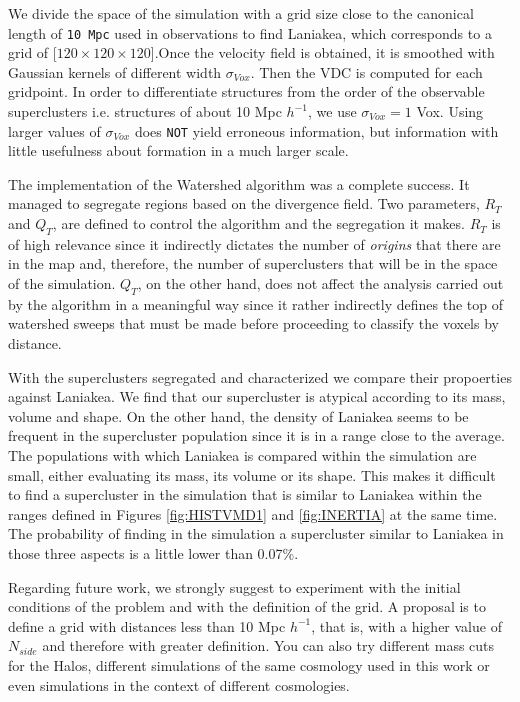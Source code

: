 \documentclass[a4paper,fleqn,usenatbib]{mnras}
\begin{document}
We divide the space of the simulation with a grid size close to the canonical length of \texttt{10 Mpc} used in observations to find Laniakea, which corresponds to a grid of [$120 \times 120 \times 120$].Once the velocity field is obtained, it is smoothed with Gaussian kernels of different width $\sigma_{Vox}$. Then the VDC is computed for each gridpoint. In order to differentiate structures from the order of the observable superclusters i.e. structures of about 10 Mpc $h^{-1}$, we use $\sigma_{Vox} = 1$ Vox. Using larger values of $\sigma_{Vox}$ does \texttt{NOT} yield erroneous information, but information with little usefulness about formation in a much larger scale.  

The implementation of the Watershed algorithm was a complete success. It managed to segregate regions based on the divergence field. Two parameters, $R_T$ and $Q_T$, are defined to control the algorithm and the segregation it makes. $R_T$ is of high relevance since it indirectly dictates the number of \emph{origins} that there are in the map and, therefore, the number of superclusters that will be in the space of the simulation. $Q_T$, on the other hand, does not affect the analysis carried out by the algorithm in a meaningful way since it rather indirectly defines the top of watershed sweeps that must be made before proceeding to classify the voxels by distance.

With the superclusters segregated and characterized we compare their propoerties against Laniakea. We find that our supercluster is  atypical according to its mass, volume and shape. On the other hand, the density of Laniakea seems to be frequent in the supercluster population since it is in a range close to the average. The populations with which Laniakea is compared within the simulation are small, either evaluating its mass, its volume or its shape. This makes it difficult to find a supercluster in the simulation that is similar to Laniakea within the ranges defined in Figures \ref{fig:HISTVMD1} and \ref{fig:INERTIA} at the same time. The probability of finding in the simulation a supercluster similar to Laniakea in those three aspects is a little lower than 0.07\%.

Regarding future work, we strongly suggest to experiment with the initial conditions of the problem and with the definition of the grid. A proposal is to define a grid with distances less than 10 Mpc $h^{-1}$, that is, with a higher value of $N_{side}$ and therefore with greater definition. You can also try different mass cuts for the Halos, different simulations of the same cosmology used in this work or even simulations in the context of different cosmologies.


\end{document}
